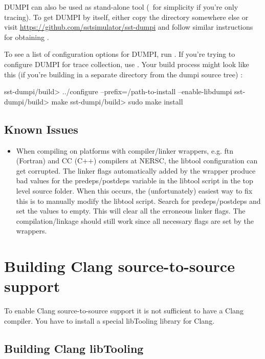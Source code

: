 DUMPI can also be used as stand-alone tool (\eg~for simplicity if you're only tracing). 
To get DUMPI by itself, either copy the  directory somewhere else or visit \url{https://github.com/sstsimulator/sst-dumpi} and follow similar instructions for obtaining \sstmacro.

To see a list of configuration options for DUMPI, run .  
If you're trying to configure DUMPI for trace collection, use .
Your build process might look like this (if you're building in a separate directory from the dumpi source tree) :

\begin{ShellCmd}
sst-dumpi/build> ../configure --prefix=/path-to-install --enable-libdumpi
sst-dumpi/build> make
sst-dumpi/build> sudo make install
\end{ShellCmd}

\subsection{Known Issues}
\label{subsubsec:building:dumpi:issues}

\begin{itemize}
\item When compiling on platforms with compiler/linker wrappers, e.g. ftn (Fortran) and CC (C++) compilers 
at NERSC, the libtool configuration can get corrupted.  The linker flags automatically added by the 
wrapper produce bad values for the predeps/postdeps variable in the libtool script in the top 
level source folder.  When this occurs, the (unfortunately) easiest way to fix this is to manually modify
the libtool script.  Search for predeps/postdeps and set the values to empty.
This will clear all the erroneous linker flags.  The compilation/linkage should still work since 
all necessary flags are set by the wrappers. 
\end{itemize}


\section{Building Clang source-to-source support}
\label{sec:buildingClang}

To enable Clang source-to-source support it is not sufficient to have a Clang compiler.  You have to install a special libTooling library for Clang.

\subsection{Building Clang libTooling}
\label{subsec:buildingClanglibTooling}

